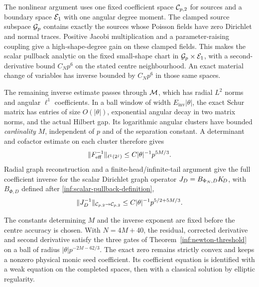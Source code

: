 The nonlinear argument uses one fixed coefficient space
$\mathcal C_{p,2}$ for sources and a boundary space $\mathcal E_1$ with one
angular degree moment. The clamped source subspace $\mathcal{G}_p$
contains exactly the sources whose Poisson fields have zero
Dirichlet and normal traces. Positive Jacobi multiplication and a
parameter-raising coupling give a high-shape-degree gain on these
clamped fields. This makes the scalar pullback analytic on the
fixed small-shape chart in $\mathcal{G}_p\times\mathcal E_1$, with a
second-derivative bound $C_Np^6$ on the stated centre neighbourhood.
An exact material change of variables has inverse bounded by
$C_Np^6$ in those same spaces.

The remaining inverse estimate passes through
$\mathcal M$, which has radial $L^2$ norms and angular $\ell^1$
coefficients. In a ball window of width $E_{\mathrm{inv}}|\theta|$,
the exact Schur matrix has entries of size $O(|\theta|)$,
exponential angular decay in two matrix norms, and the actual
Hilbert gap. Its logarithmic angular clusters have bounded
\emph{cardinality} $M$, independent of $p$ and of the separation
constant. A determinant and cofactor estimate on each cluster
therefore gives
\[
 \lVert F_{\mathrm{eff}}^{-1}\rVert_{\ell^1(2^j)}
 \le C|\theta|^{-1}p^{5M/3}.
\]
Radial graph reconstruction and a finite-head/infinite-tail
argument give the full coefficient inverse for the scalar Dirichlet
graph operator $J_D=B_{\Phi_N,D}K_{\!D}$, with $B_{\Phi,D}$ defined after
\eqref{inf:scalar-pullback-definition},
\begin{equation}\label{inf:intro-inverse}
 \lVert J_D^{-1}\rVert_{\mathcal C_{p,2}\to\mathcal C_{p,2}}
 \le C|\theta|^{-1}p^{5/2+5M/3}.
\end{equation}

The constants determining $M$ and the inverse exponent are fixed
before the centre accuracy is chosen. With
$N=4M+40$, the residual, corrected derivative and second derivative
satisfy the three gates of Theorem~\ref{inf:newton-threshold} on a
ball of radius $|\theta|p^{-2M-62/3}$.
The exact zero remains strictly convex and keeps a nonzero
physical monic seed coefficient. Its coefficient equation is
identified with a weak equation on the completed spaces, then
with a classical solution by elliptic regularity.

